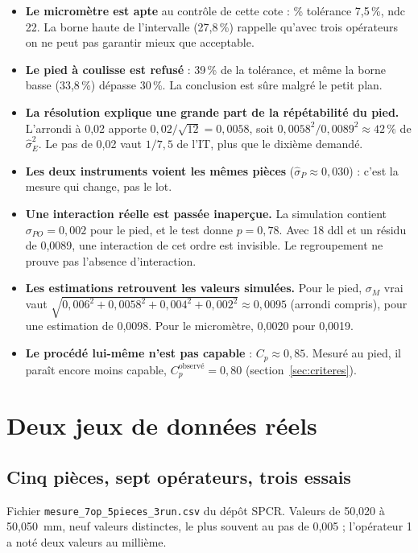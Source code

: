 \documentclass[11pt,a4paper]{article}
\theoremstyle{sj}
\theoremstyle{definition}
\theoremstyle{remark}
\providecommand{\og}{\guillemotleft\nobreakspace}
\providecommand{\fg}{\nobreakspace\guillemotright}
\begin{document}
\begin{itemize}[leftmargin=1.4em]
\item \textbf{Le micromètre est apte} au contrôle de cette cote : \% tolérance 7,5\,\%, ndc 22. La borne haute de l'intervalle (27,8\,\%) rappelle qu'avec trois opérateurs on ne peut pas garantir mieux que \og acceptable\fg{}.
\item \textbf{Le pied à coulisse est refusé} : 39\,\% de la tolérance, et même la borne basse (33,8\,\%) dépasse 30\,\%. La conclusion est sûre malgré le petit plan.
\item \textbf{La résolution explique une grande part de la répétabilité du pied.} L'arrondi à 0,02 apporte $0{,}02/\sqrt{12}=0{,}0058$, soit $0{,}0058^2/0{,}0089^2\approx42\,\%$ de $\hat\sigma_E^2$. Le pas de 0,02 vaut $1/7{,}5$ de l'IT, plus que le dixième demandé.
\item \textbf{Les deux instruments voient les mêmes pièces} ($\hat\sigma_P\approx0{,}030$) : c'est la mesure qui change, pas le lot.
\item \textbf{Une interaction réelle est passée inaperçue.} La simulation contient $\sigma_{PO}=0{,}002$ pour le pied, et le test donne $p=0{,}78$. Avec 18 ddl et un résidu de 0,0089, une interaction de cet ordre est invisible. Le regroupement ne prouve pas l'absence d'interaction.
\item \textbf{Les estimations retrouvent les valeurs simulées.} Pour le pied, $\sigma_M$ vrai vaut $\sqrt{0{,}006^2+0{,}0058^2+0{,}004^2+0{,}002^2}\approx0{,}0095$ (arrondi compris), pour une estimation de 0,0098. Pour le micromètre, 0,0020 pour 0,0019.
\item \textbf{Le procédé lui-même n'est pas capable} : $C_p\approx0{,}85$. Mesuré au pied, il paraît encore moins capable, $C_p^{\text{observé}}=0{,}80$ (section~\ref{sec:criteres}).
\end{itemize}

\section{Deux jeux de données réels}\label{sec:reel}

\subsection{Cinq pièces, sept opérateurs, trois essais}

Fichier \texttt{mesure\_7op\_5pieces\_3run.csv} du dépôt SPCR. Valeurs de 50,020 à 50,050~mm, neuf valeurs distinctes, le plus souvent au pas de 0,005 ; l'opérateur 1 a noté deux valeurs au millième.
\end{document}
